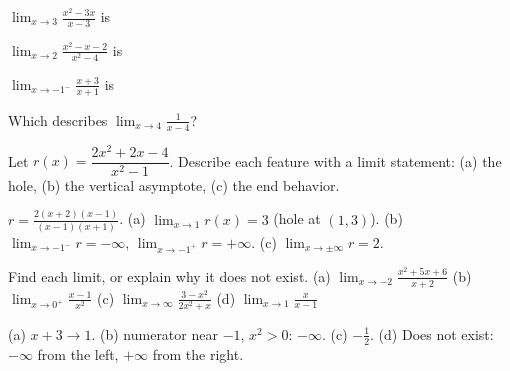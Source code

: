 \begin{exo}{}
$\displaystyle\lim_{x\to3}\frac{x^2-3x}{x-3}$ is
\end{exo}
\begin{exo}{}
$\displaystyle\lim_{x\to2}\frac{x^2-x-2}{x^2-4}$ is
\end{exo}
\begin{exo}{}
$\displaystyle\lim_{x\to-1^-}\frac{x+3}{x+1}$ is
\end{exo}
\begin{exo}{}
Which describes $\displaystyle\lim_{x\to4}\frac{1}{x-4}$?
\end{exo}
\begin{exo}{}
Let $r(x)=\dfrac{2x^2+2x-4}{x^2-1}$. Describe each feature with a limit statement: (a) the hole, (b) the vertical asymptote, (c) the end behavior.
\begin{solution}
$r=\frac{2(x+2)(x-1)}{(x-1)(x+1)}$. (a) $\lim_{x\to1}r(x)=3$ (hole at $(1,3)$). (b) $\lim_{x\to-1^-}r=-\infty$, $\lim_{x\to-1^+}r=+\infty$. (c) $\lim_{x\to\pm\infty}r=2$.
\end{solution}
\end{exo}
\begin{exo}{}
Find each limit, or explain why it does not exist.
(a) $\displaystyle\lim_{x\to-2}\frac{x^2+5x+6}{x+2}$ \quad (b) $\displaystyle\lim_{x\to0^+}\frac{x-1}{x^2}$ \quad (c) $\displaystyle\lim_{x\to\infty}\frac{3-x^2}{2x^2+x}$ \quad (d) $\displaystyle\lim_{x\to1}\frac{x}{x-1}$
\begin{solution}
(a) $x+3\to1$. (b) numerator near $-1$, $x^2>0$: $-\infty$. (c) $-\frac12$. (d) Does not exist: $-\infty$ from the left, $+\infty$ from the right.
\end{solution}
\end{exo}

